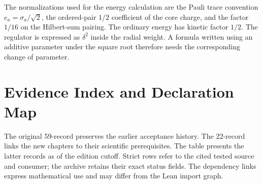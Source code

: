 The normalizations used for the energy calculation are the Pauli trace convention $e_a=\sigma_a/\sqrt2$, the ordered-pair $1/2$ coefficient of the core charge, and the factor $1/16$ on the Hilbert-sum pairing. The ordinary energy has kinetic factor $1/2$. The regulator is expressed as $\delta^2$ inside the radial weight. A formula written using an additive parameter under the square root therefore needs the corresponding change of parameter.

\chapter{Evidence Index and Declaration Map}\label{app:evidence}
The original 59-record  preserves the earlier acceptance history. The 22-record  links the new chapters to their scientific prerequisites. The table presents the latter records as of the edition cutoff. Strict rows refer to the cited tested source and consumer; the archive retains their exact status fields. The dependency links express mathematical use and may differ from the Lean import graph.

